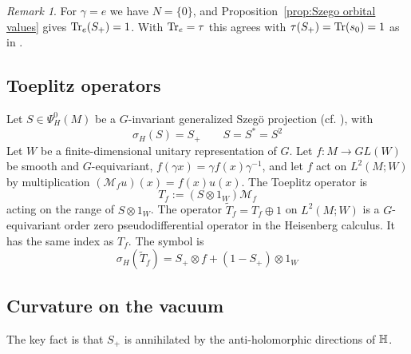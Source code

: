 \documentclass[11pt]{amsart}
\theoremstyle{plain}
\theoremstyle{definition}
\theoremstyle{remark}
\newtheorem{remark}[theorem]{Remark}
\begin{document}
\begin{remark}
For $\gamma=e$ we have $N=\{0\}$, and Proposition~\ref{prop:Szego orbital values} gives $\operatorname{Tr}_e(S_+)=1$.
With   $\operatorname{Tr}_e=\tau$ this agrees with $\tau(S_+)=\operatorname{Tr}(s_0)=1$ as in  \cite{GvE25}.
\end{remark}









\subsection{Toeplitz operators}\label{sec:Toeplitz set-up}

Let $S\in \Psi^0_H(M)$ be a $G$-invariant generalized Szeg\"o projection (cf. \cite{EMxx}), with
\[ \sigma_H(S)=S_+ \qquad S=S^*=S^2 \]
Let $W$ be a finite-dimensional unitary representation of $G$.
Let $f:M\to GL(W)$ be smooth and $G$-equivariant, $f(\gamma x)=\gamma f(x)\gamma^{-1}$,
and let $f$ act on $L^2(M;W)$ by multiplication $(\mathcal M_fu)(x)=f(x)u(x)$.
The Toeplitz operator is 
\[ T_f:=(S\otimes1_W)\mathcal M_f\]
acting on the range of  $S\otimes1_W$.
The operator  $\tilde T_f=T_f\oplus1$ on $L^2(M;W)$ is a $G$-equivariant order zero pseudodifferential operator in the Heisenberg calculus.
It has the same index as $T_f$.
The symbol is
\[ \sigma_H(\tilde T_f)=S_+\otimes f+(1-S_+)\otimes 1_W\]



\subsection{Curvature on the vacuum}\label{sec:vacuum curvature}

The key fact is that $S_+$ is annihilated by the anti-holomorphic directions of $\mathbb{H}$.
\end{document}
